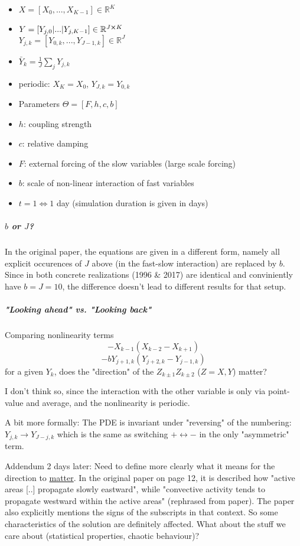 \documentclass[11pt]{article}
\newcommand{\R}{{\mathbb{R}}}
\begin{document}
\begin{itemize}
\item \(X = [X_0, ..., X_{K-1}] \in \R^K\)
\item \(Y = [Y_{j, 0} | ... | Y_{j, K-1}] \in \R^{J \cross K}\) \\
\(Y_{j,k} = [Y_{0,k}, ..., Y_{J-1,k}] \in  \R^J\)
\item \(\bar{Y}_k = \frac{1}{J}\sum_j Y_{j,k}\)
\item periodic: \(X_K = X_0\), \(Y_{J,k} = Y_{0,k}\)
\item Parameters \(\Theta = [F, h, c, b]\)
\item \(h\): coupling strength
\item \(c\): relative damping
\item \(F\): external forcing of the slow variables (large scale forcing)
\item \(b\): scale of non-linear interaction of fast variables
\item \(t = 1 \Leftrightarrow 1\) day (simulation duration is given in days)
\end{itemize}

\subparagraph{\(b\) or \(J\)?}
\label{sec:org6ab9d5a}
In the original paper, the equations are given in a different form, namely all
explicit occurences of \(J\) above (in the fast-slow interaction) are replaced by
\(b\). Since in both concrete realizations (1996 \& 2017) are identical and conviniently
have \(b=J=10\), the difference doesn't lead to different results for that setup.

\subparagraph{"Looking ahead" vs. "Looking back"}
\label{sec:org58c604a}
Comparing nonlinearity terms
$$-X_{k-1}(X_{k-2} - X_{k+1})$$
$$-bY_{j+1,k}(Y_{j+2,k} - Y_{j-1, k})$$
for a given \(Y_{k}\), does the "direction" of the \(Z_{k\pm 1}Z_{k\pm 2}\) (\(Z=X,Y\)) matter?

I don't think so, since the interaction with the other variable is only via point-value
and average, and the nonlinearity is periodic.

A bit more formally:
The PDE is invariant under "reversing" of the numbering:
\(Y_{j,k} \rightarrow Y_{J-j,k}\) which is the same as switching \(+ \leftrightarrow -\) in
the only "asymmetric" term.

Addendum 2 days later: Need to define more clearly what it means for the direction to
\uline{matter}. In the original paper on page 12, it is described how "active areas [..] propagate
slowly eastward", while "convective activity tends to propagate westward within the active
areas" (rephrased from paper). The paper also explicitly mentions the signs of the subscripts
in that context. So some characteristics of the solution are definitely affected.
What about the stuff we care about (statistical properties, chaotic behaviour)?
\end{document}
